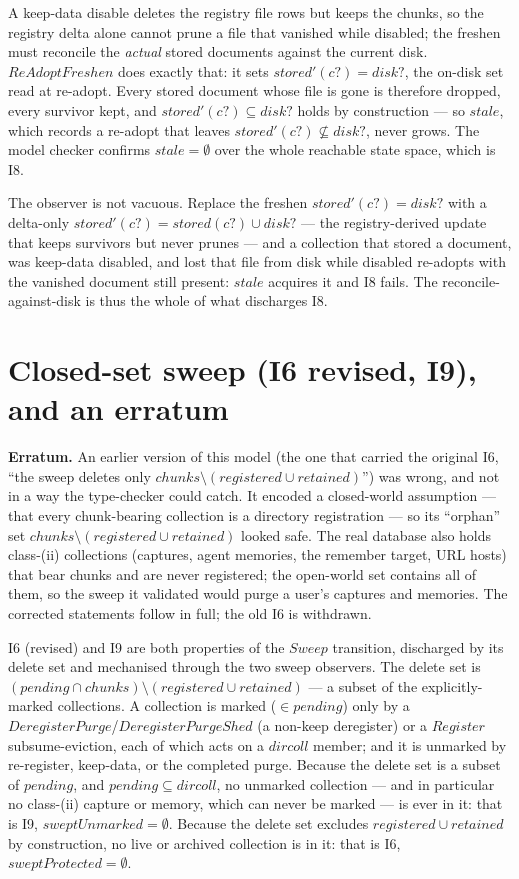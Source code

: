 \documentclass[a4paper]{article}
\begin{document}
A keep-data disable deletes the registry file rows but keeps the chunks, so the
registry delta alone cannot prune a file that vanished while disabled; the
freshen must reconcile the \textit{actual} stored documents against the current
disk.  $ReAdoptFreshen$ does exactly that: it sets $stored'(c?) = disk?$, the
on-disk set read at re-adopt.  Every stored document whose file is gone is
therefore dropped, every survivor kept, and $stored'(c?) \subseteq disk?$ holds
by construction --- so $stale$, which records a re-adopt that leaves
$stored'(c?) \not\subseteq disk?$, never grows.  The model checker confirms
$stale = \emptyset$ over the whole reachable state space, which is I8.

The observer is not vacuous.  Replace the freshen $stored'(c?) = disk?$ with a
delta-only $stored'(c?) = stored(c?) \cup disk?$ --- the registry-derived update
that keeps survivors but never prunes --- and a collection that stored a
document, was keep-data disabled, and lost that file from disk while disabled
re-adopts with the vanished document still present: $stale$ acquires it and I8
fails.  The reconcile-against-disk is thus the whole of what discharges I8.

\section{Closed-set sweep (I6 revised, I9), and an erratum}

\textbf{Erratum.}  An earlier version of this model (the one that carried the
original I6, ``the sweep deletes only $chunks \setminus (registered \cup
retained)$'') was wrong, and not in a way the type-checker could catch.  It
encoded a closed-world assumption --- that every chunk-bearing collection is a
directory registration --- so its ``orphan'' set $chunks \setminus (registered
\cup retained)$ looked safe.  The real database also holds class-(ii)
collections (captures, agent memories, the remember target, URL hosts) that bear
chunks and are never registered; the open-world set contains all of them, so the
sweep it validated would purge a user's captures and memories.  The corrected
statements follow in full; the old I6 is withdrawn.

I6 (revised) and I9 are both properties of the $Sweep$ transition, discharged by
its delete set and mechanised through the two sweep observers.  The delete set is
$(pending \cap chunks) \setminus (registered \cup retained)$ --- a subset of the
explicitly-marked collections.  A collection is marked ($\in pending$) only by a
$DeregisterPurge$/$DeregisterPurgeShed$ (a non-keep deregister) or a $Register$
subsume-eviction, each of which acts on a $dircoll$ member; and it is unmarked by
re-register, keep-data, or the completed purge.  Because the delete set is a
subset of $pending$, and $pending \subseteq dircoll$, no unmarked collection ---
and in particular no class-(ii) capture or memory, which can never be marked ---
is ever in it: that is I9, $sweptUnmarked = \emptyset$.  Because the delete set
excludes $registered \cup retained$ by construction, no live or archived
collection is in it: that is I6, $sweptProtected = \emptyset$.
\end{document}
